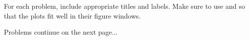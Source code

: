 \noindent For each problem, include appropriate titles and labels.  Make sure to use  and  so that the plots fit well in their figure windows.

\noindent Problems continue on the next page...
\newpage
{}
